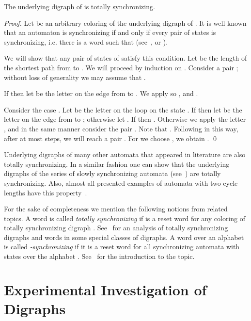 \documentclass[runningheads]{llncs}
\begin{document}
\begin{proposition}
The underlying digraph of  is totally synchronizing.
\end{proposition}
\begin{proof}
Let  be an arbitrary coloring of the underlying digraph of .
It is well known that an automaton is synchronizing if and only if every pair of states  is synchronizing, i.e. there is a word  such that  (see~\cite{Cerny1964}, or \cite[Proposition~2.1]{Volkov2008Survey}).

We will show that any pair of states  of  satisfy this condition.
Let  be the length of the shortest path from  to .
We will proceed by induction on .
Consider a pair ; without loss of generality we may assume that .

If  then let  be the letter on the edge from  to .
We apply  so , and .

Consider the case .
Let  be the letter on the loop on the state .
If  then let  be the letter on the edge from  to ; otherwise let .
If  then .
Otherwise we apply the letter , and in the same manner consider the pair .
Note that .
Following in this way, after at most  steps, we will reach a pair .
For  we choose , we obtain .
\qed
\end{proof}

Underlying digraphs of many other automata that appeared in literature are also totally synchronizing.
In a similar fashion one can show that the underlying digraphs of the series of slowly synchronizing automata (see~\cite{AGV2013,KS2014SynchronizingAutomataWithLargeResetLengths}) are totally synchronizing. Also, almost all presented examples of automata with two cycle lengths have this property~\cite{GusevPribavkina2014ResetThresholdsOfAutomataWithTwoCycleLengths}.

For the sake of completeness we mention the following notions from related topics.
A word  is called \emph{totally synchronizing} if  is a reset word for any coloring of totally synchronizing digraph . See~\cite{Cardoso2014PhD} for an analysis of totally synchronizing digraphs and words in some special classes of digraphs. A word over an alphabet  is called \emph{-synchronizing} if it is a reset word for all synchronizing automata with  states over the alphabet . See~\cite{Cherubini2007SynchronizingAndCollapsingWords} for the introduction to the topic.


\section{Experimental Investigation of Digraphs}
\end{document}
